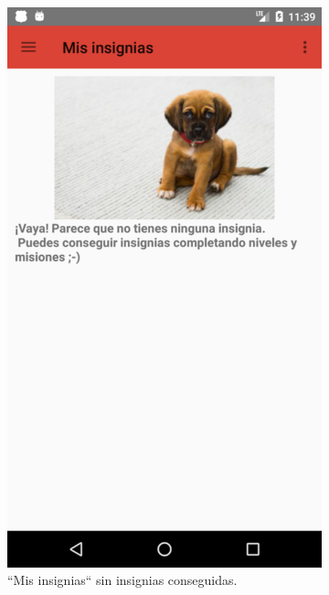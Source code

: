 \documentclass[twoside]{report}
\begin{document}
\begin{figure}[H]
\begin{center}
	\begin{subfigure}[t]{.3\linewidth}
		\includegraphics[scale=0.2]{images/userguide/7.png}
		\caption{“Mis insignias“ sin insignias conseguidas.}
	\end{subfigure}\hspace{5mm}%
	\begin{subfigure}[t]{.3\linewidth}

\end{subfigure}
\end{center}
\end{figure}
\end{document}
